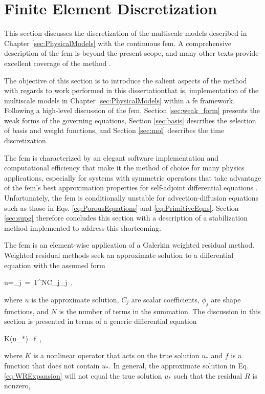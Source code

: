 \section{Finite Element Discretization}
\label{sec:fem}

This section discusses the discretization of the multiscale models described in Chapter \ref{sec:PhysicalModels} with the continuous \gls{fem}. A comprehensive description of the \gls{fem} is beyond the present scope, and many other texts provide excellent coverage of the method \cite{zienkiewicz,reddy,logan}. 

The objective of this section is to introduce the salient aspects of the method with regards to work performed in this dissertation\mdash that is, implementation of the multiscale models in Chapter \ref{sec:PhysicalModels} within a \gls{fe} framework. Following a high-level discussion of the \gls{fem}, Section \ref{sec:weak_form} presents the weak forms of the governing equations, Section \ref{sec:basis} describes the selection of basis and weight functions, and Section \ref{sec:mol} describes the time discretization. 

The \gls{fem} is characterized by an elegant software implementation and computational efficiency that make it the method of choice for many physics applications, especially for systems with symmetric operators that take advantage of the \gls{fem}'s best approximation properties for self-adjoint differential equations \cite{reddy,zohdi,zienkiewicz}. Unfortunately, the \gls{fem} is conditionally unstable for advection-diffusion equations such as those in Eqs. \eqref{eq:PorousEquations} and \eqref{eq:PrimitiveEqns}. Section \ref{sec:supg} therefore concludes this section with a description of a stabilization method implemented to address this shortcoming.

The \gls{fem} is an element-wise application of a Galerkin weighted residual method. Weighted residual methods seek an approximate solution to a differential equation with the assumed form

\beq
\label{eq:WRExpansion}
u=\sum_{j\ =\ 1}^NC_j\phi_j\ ,
\eeq

\noindent where \(u\) is the approximate solution, \(C_j\) are scalar coefficients, \(\phi_j\) are shape functions, and \(N\) is the number of terms in the summation. The discussion in this section is presented in terms of a generic differential equation

\beq
\label{eq:linear1}
K(u_*)=f\ ,
\eeq

\noindent where \(K\) is a nonlinear operator that acts on the true solution \(u_*\) and \(f\) is a function that does not contain \(u_*\). In general, the approximate solution in Eq. \eqref{eq:WRExpansion} will not equal the true solution \(u_*\) such that the residual \(R\) is nonzero,

